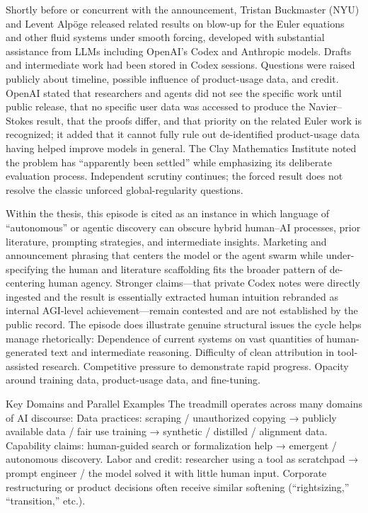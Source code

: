 Shortly before or concurrent with the announcement, Tristan Buckmaster (NYU) and Levent Alpöge released related results on blow-up for the Euler equations and other fluid systems under smooth forcing, developed with substantial assistance from LLMs including OpenAI’s Codex and Anthropic models. Drafts and intermediate work had been stored in Codex sessions. Questions were raised publicly about timeline, possible influence of product-usage data, and credit. OpenAI stated that researchers and agents did not see the specific work until public release, that no specific user data was accessed to produce the Navier–Stokes result, that the proofs differ, and that priority on the related Euler work is recognized; it added that it cannot fully rule out de-identified product-usage data having helped improve models in general. The Clay Mathematics Institute noted the problem has “apparently been settled” while emphasizing its deliberate evaluation process. Independent scrutiny continues; the forced result does not resolve the classic unforced global-regularity questions.

Within the thesis, this episode is cited as an instance in which language of “autonomous” or agentic discovery can obscure hybrid human–AI processes, prior literature, prompting strategies, and intermediate insights. Marketing and announcement phrasing that centers the model or the agent swarm while under-specifying the human and literature scaffolding fits the broader pattern of de-centering human agency. Stronger claims—that private Codex notes were directly ingested and the result is essentially extracted human intuition rebranded as internal AGI-level achievement—remain contested and are not established by the public record.
The episode does illustrate genuine structural issues the cycle helps manage rhetorically:
Dependence of current systems on vast quantities of human-generated text and intermediate reasoning.
Difficulty of clean attribution in tool-assisted research.
Competitive pressure to demonstrate rapid progress.
Opacity around training data, product-usage data, and fine-tuning.

Key Domains and Parallel Examples
The treadmill operates across many domains of AI discourse:
Data practices: scraping / unauthorized copying → publicly available data / fair use training → synthetic / distilled / alignment data.
Capability claims: human-guided search or formalization help → emergent / autonomous discovery.
Labor and credit: researcher using a tool as scratchpad → prompt engineer / the model solved it with little human input.
Corporate restructuring or product decisions often receive similar softening (“rightsizing,” “transition,” etc.).

